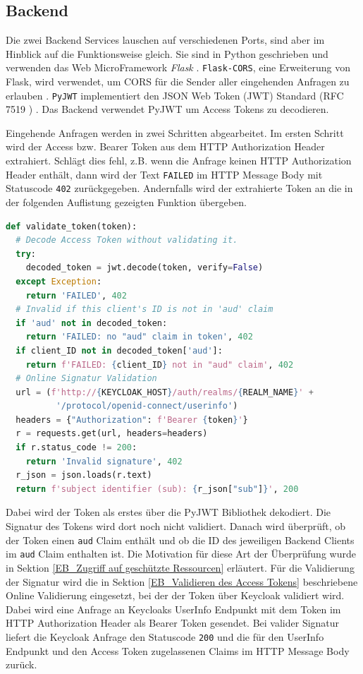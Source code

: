 \subsection{Backend} \label{EB_Backend}

Die zwei Backend Services lauschen auf verschiedenen Ports, sind aber im Hinblick auf die Funktionsweise gleich. Sie sind in Python geschrieben und verwenden das Web MicroFramework \textit{Flask} \cite{EB48}. \texttt{Flask-CORS}, eine Erweiterung von Flask, wird verwendet, um CORS für die Sender aller eingehenden Anfragen zu erlauben \cite{EB49}. \texttt{PyJWT} implementiert den JSON Web Token (JWT) Standard (RFC 7519 \cite{SSEB_RFC7519}) \cite{EB51}. Das Backend verwendet PyJWT um Access Tokens zu decodieren.

Eingehende Anfragen werden in zwei Schritten abgearbeitet. Im ersten Schritt wird der Access bzw. Bearer Token aus dem HTTP Authorization Header extrahiert. Schlägt dies fehl, z.B. wenn die Anfrage keinen HTTP Authorization Header enthält, dann wird der Text \texttt{FAILED} im HTTP Message Body mit Statuscode \texttt{402} zurückgegeben. Andernfalls wird der extrahierte Token an die in der folgenden Auflistung gezeigten Funktion übergeben.

\begin{lstlisting}[caption=Token Validierung im Backend, captionpos=b, language=python, label=validateTokenFunction]
def validate_token(token):
  # Decode Access Token without validating it.
  try:
    decoded_token = jwt.decode(token, verify=False)
  except Exception:
    return 'FAILED', 402
  # Invalid if this client's ID is not in 'aud' claim
  if 'aud' not in decoded_token:
    return 'FAILED: no "aud" claim in token', 402
  if client_ID not in decoded_token['aud']:
    return f'FAILED: {client_ID} not in "aud" claim', 402
  # Online Signatur Validation
  url = (f'http://{KEYCLOAK_HOST}/auth/realms/{REALM_NAME}' +
          '/protocol/openid-connect/userinfo')
  headers = {"Authorization": f'Bearer {token}'}
  r = requests.get(url, headers=headers)
  if r.status_code != 200:
    return 'Invalid signature', 402
  r_json = json.loads(r.text)
  return f'subject identifier (sub): {r_json["sub"]}', 200
\end{lstlisting} %

Dabei wird der Token als erstes über die PyJWT Bibliothek dekodiert. Die Signatur des Tokens wird dort noch nicht validiert. Danach wird überprüft, ob der Token einen \texttt{aud} Claim enthält und ob die ID des jeweiligen Backend Clients im \texttt{aud} Claim enthalten ist. Die Motivation für diese Art der Überprüfung wurde in Sektion \ref{EB_Zugriff auf geschützte Ressourcen} erläutert. Für die Validierung der Signatur wird die in Sektion \ref{EB_Validieren des Access Tokens} beschriebene Online Validierung eingesetzt, bei der der Token über Keycloak validiert wird. Dabei wird eine Anfrage an Keycloaks UserInfo Endpunkt mit dem Token im HTTP Authorization Header als Bearer Token gesendet. Bei valider Signatur liefert die Keycloak Anfrage den Statuscode \texttt{200} und die für den UserInfo Endpunkt und den Access Token zugelassenen Claims im HTTP Message Body zurück. 

